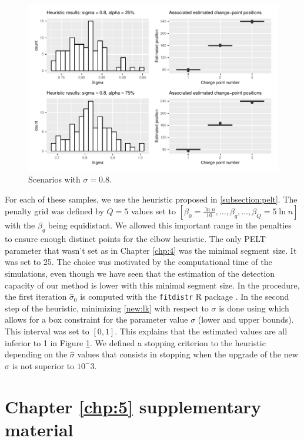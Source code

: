 \begin{appendices}
\begin{figure}[ht]
    \centering
    \includegraphics{figs/App/SIM_CHAP5_2.pdf}
    \caption{Scenarios with $\sigma = 0.8$.}
    \label{fig:sim:sigma2}
\end{figure}

For each of these samples, we use the heuristic proposed in \ref{subsection:pelt}. The penalty grid was defined by $Q = 5$ values set to $[\beta_0 = \frac{\ln n}{10},\dots,\beta_{q},\dots,\beta_{Q} = 5\ln n]$ with the $\beta_q$ being equidistant. We allowed this important range in the penalties to ensure enough distinct points for the elbow heuristic. The only PELT parameter that wasn't set as in Chapter \ref{chp:4} was the minimal segment size. It was set to 25. The choice was motivated by the computational time of the simulations, even though we have seen that the estimation of the detection capacity of our method is lower with this minimal segment size. In the procedure, the first iteration $\widehat{\sigma}_0$ is computed with the \texttt{fitdistr} R package \cite{delignette2015}. In the second step of the heuristic, minimizing \ref{new:lk} with respect to $\sigma$ is done using \cite{Byrd1995} which allows for a box constraint for the parameter value $\sigma$ (lower and upper bounds). This interval was set to $[0,1]$. This explains that the estimated values are all inferior to 1 in Figure \ref{fig:sim:sigma2}. We defined a stopping criterion to the heuristic depending on the $\widehat{\sigma}$ values that consists in stopping when the upgrade of the new $\widehat{\sigma}$ is not superior to $10^-3$.


\chapter{Chapter \ref{chp:5} supplementary material}\label{app:chap5}


\end{appendices}
